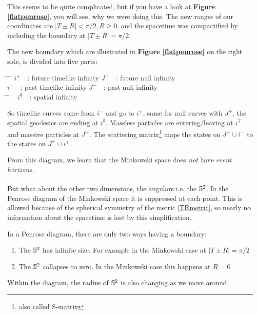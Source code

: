 	This seems to be quite complicated, but if you have a look at \textbf{Figure \ref{flatpenrose}}, you will see, why we were doing this. The new ranges of our coordinates are $|T \pm R|< \pi/2, R\geq0$, and the spacetime was compactified by including the boundary at $|T \pm R| = \pi/2$. 
	
	The new boundary which are illustrated in \textbf{Figure \ref{flatpenrose}} on the right side, is divided into five parts:	
		\begin{tabbing}
			\hspace{0.1\linewidth} \= \hspace{0.4\linewidth} \= \hspace{0.1\linewidth} \= \hfill \kill
			$i^+$~~: \> future timelike infinity \> $J^+$~~: \> future null infinity \\
			$i^-$~~: \> past timelike infinity \> $J^-$~~: \> past null infinity\\
			\hspace{0.35\linewidth} \= \hspace{0.1\linewidth} \= \hfill \kill	
			~ \> $i^0$~~: \> spatial infinity 
		\end{tabbing}
	So timelike curves come from $i^-$ and go to $i^+$, same for null curves with $J^\mp$, the spatial geodesics are ending at $i^0$. Massless particles are entering/leaving at $i^\mp$ and massive particles at $J^\mp$. The scattering matrix\footnote{also called S-matrix} maps the states on $J^- \cup i^-$ to the states on $J^+ \cup i^+$.	
	
	From this diagram, we learn that the Minkowski space does \textit{not} have \textit{event horizons}.
	\\ \\
	But what about the other two dimensions, the angulars i.e. the $\mathbb{S}^2$. In the Penrose diagram of the Minkowski space it is suppressed at each point. This is allowed because of the spherical symmetry of the metric \eqref{TRmetric}, so nearly no information about the spacetime is lost by this simplification. 
	
	In a Penrose diagram, there are only two ways having a boundary:
	\begin{enumerate}
		\item The $\mathbb{S}^2$ has infinite size. For example in the Minkowski case at $|T \pm R| = \pi/2$
		\item The $\mathbb{S}^2$ collapses to zero. In the Minkowski case this happens at $R=0$
	\end{enumerate}
	Within the diagram, the radius of $\mathbb{S}^2$ is also changing as we move around. 	
	
